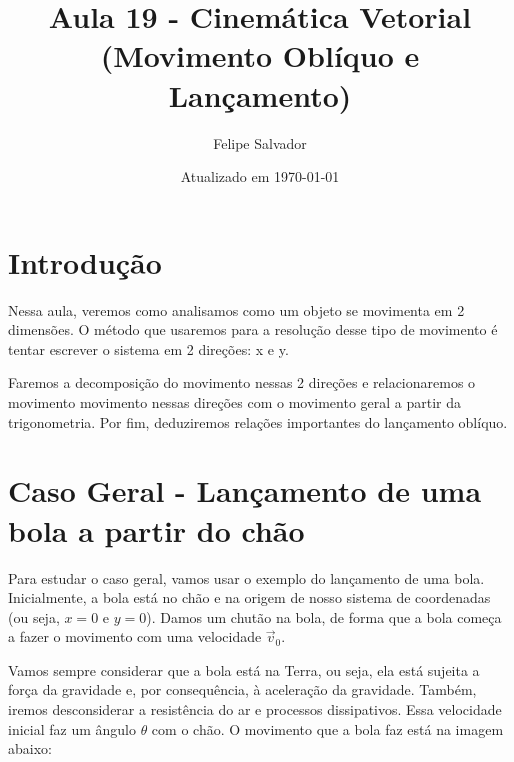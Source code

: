 \documentclass[12pt]{extarticle}
\title{Aula 19 - Cinemática Vetorial (Movimento Oblíquo e Lançamento)}
\author{Felipe Salvador}
\date{Atualizado em \today}
\newcommand{\<}{\langle}
\renewcommand{\>}{\rangle}
\theoremstyle{definition}
\begin{document}
\maketitle

\section{Introdução}

Nessa aula, veremos como analisamos como um objeto se movimenta em 2 dimensões. O método que usaremos para a resolução desse tipo de movimento é tentar escrever o sistema em 2 direções: x e y.

Faremos a decomposição do movimento nessas 2 direções e relacionaremos o movimento movimento nessas direções com o movimento geral a partir da trigonometria. Por fim, deduziremos relações importantes do lançamento oblíquo.

\section{Caso Geral - Lançamento de uma bola a partir do chão}

Para estudar o caso geral, vamos usar o exemplo do lançamento de uma bola. Inicialmente, a bola está no chão e na origem de nosso sistema de coordenadas (ou seja, $x=0$ e $y=0$). Damos um chutão na bola, de forma que a bola começa a fazer o movimento com uma velocidade $\vec{v}_0$. 

Vamos sempre considerar que a bola está na Terra, ou seja, ela está sujeita a força da gravidade e, por consequência, à aceleração da gravidade. Também, iremos desconsiderar a resistência do ar e processos dissipativos. Essa velocidade inicial faz um ângulo $\theta$ com o chão. O movimento que a bola faz está na imagem abaixo:
\end{document}
